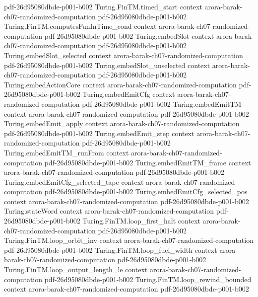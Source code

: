 \begin{theorem}
  {pdf-26d95080dbde-p001-b002}
\proofstep
  {Turing.FinTM.timed_start}
  {context}
  {arora-barak-ch07-randomized-computation}
  {pdf-26d95080dbde-p001-b002}
\proofstep
  {Turing.FinTM.computesFunInTime_cond}
  {context}
  {arora-barak-ch07-randomized-computation}
  {pdf-26d95080dbde-p001-b002}
\proofstep
  {Turing.embedSlot}
  {context}
  {arora-barak-ch07-randomized-computation}
  {pdf-26d95080dbde-p001-b002}
\proofstep
  {Turing.embedSlot_selected}
  {context}
  {arora-barak-ch07-randomized-computation}
  {pdf-26d95080dbde-p001-b002}
\proofstep
  {Turing.embedSlot_unselected}
  {context}
  {arora-barak-ch07-randomized-computation}
  {pdf-26d95080dbde-p001-b002}
\proofstep
  {Turing.embedActionCore}
  {context}
  {arora-barak-ch07-randomized-computation}
  {pdf-26d95080dbde-p001-b002}
\proofstep
  {Turing.embedEmitCfg}
  {context}
  {arora-barak-ch07-randomized-computation}
  {pdf-26d95080dbde-p001-b002}
\proofstep
  {Turing.embedEmitTM}
  {context}
  {arora-barak-ch07-randomized-computation}
  {pdf-26d95080dbde-p001-b002}
\proofstep
  {Turing.embedEmit_apply}
  {context}
  {arora-barak-ch07-randomized-computation}
  {pdf-26d95080dbde-p001-b002}
\proofstep
  {Turing.embedEmit_step}
  {context}
  {arora-barak-ch07-randomized-computation}
  {pdf-26d95080dbde-p001-b002}
\proofstep
  {Turing.embedEmitTM_runFrom}
  {context}
  {arora-barak-ch07-randomized-computation}
  {pdf-26d95080dbde-p001-b002}
\proofstep
  {Turing.embedEmitTM_frame}
  {context}
  {arora-barak-ch07-randomized-computation}
  {pdf-26d95080dbde-p001-b002}
\proofstep
  {Turing.embedEmitCfg_selected_tape}
  {context}
  {arora-barak-ch07-randomized-computation}
  {pdf-26d95080dbde-p001-b002}
\proofstep
  {Turing.embedEmitCfg_selected_pos}
  {context}
  {arora-barak-ch07-randomized-computation}
  {pdf-26d95080dbde-p001-b002}
\proofstep
  {Turing.stateWord}
  {context}
  {arora-barak-ch07-randomized-computation}
  {pdf-26d95080dbde-p001-b002}
\proofstep
  {Turing.FinTM.loop_first_halt}
  {context}
  {arora-barak-ch07-randomized-computation}
  {pdf-26d95080dbde-p001-b002}
\proofstep
  {Turing.FinTM.loop_orbit_inv}
  {context}
  {arora-barak-ch07-randomized-computation}
  {pdf-26d95080dbde-p001-b002}
\proofstep
  {Turing.FinTM.loop_fuel_width}
  {context}
  {arora-barak-ch07-randomized-computation}
  {pdf-26d95080dbde-p001-b002}
\proofstep
  {Turing.FinTM.loop_output_length_le}
  {context}
  {arora-barak-ch07-randomized-computation}
  {pdf-26d95080dbde-p001-b002}
\proofstep
  {Turing.FinTM.loop_rewind_bounded}
  {context}
  {arora-barak-ch07-randomized-computation}
  {pdf-26d95080dbde-p001-b002}

\end{theorem}
